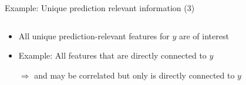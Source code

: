 \documentclass[11pt,compress,t,notes=noshow, aspectratio=169, xcolor=table]{beamer}
\begin{document}
\begin{frame}[c]{Example: Unique prediction relevant information (3)}
\begin{columns}[c]
\begin{column}{0.4\textwidth}
  \lz\pause
      \begin{itemize}
      \item All unique prediction-relevant features for $y$ are of interest
      \item Example: All features that are directly connected to $y$
      \item[$\Rightarrow$]  and  may be correlated but only  is directly connected to $y$
  \end{itemize}
  \end{column}
\end{columns}  
\end{frame}




\end{document}
